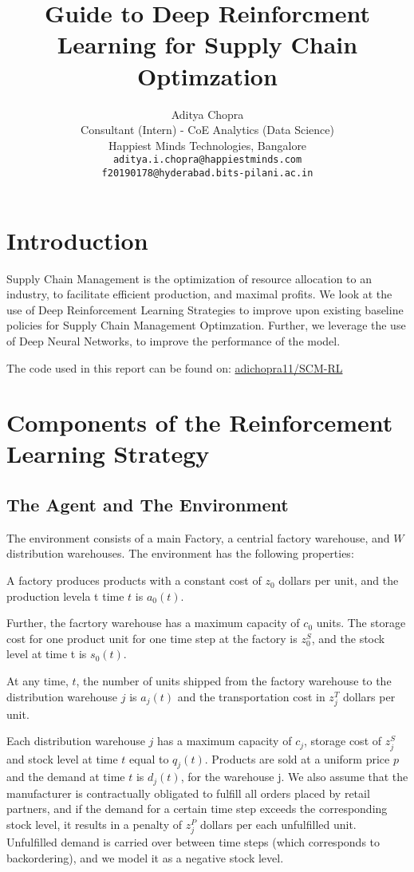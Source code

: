 \documentclass{article}
\title{Guide to Deep Reinforcment Learning for Supply Chain Optimzation}
\author{ {Aditya Chopra} \\
	Consultant (Intern) - CoE Analytics (Data Science) \\
	Happiest Minds Technologies, Bangalore \\
	\texttt{aditya.i.chopra@happiestminds.com} \\
	\texttt{f20190178@hyderabad.bits-pilani.ac.in}
}
\begin{document}
\maketitle

\section{Introduction}

Supply Chain Management is the optimization of resource allocation to an industry, to facilitate efficient production, and maximal profits. We look at the use of Deep Reinforcement Learning Strategies to improve upon existing baseline policies for Supply Chain Management Optimzation. Further, we leverage the use of Deep Neural Networks, to improve the performance of the model.

The code used in this report can be found on: \href{https://github.com/adichopra11/SCM-RL}{adichopra11/SCM-RL}


\section{Components of the Reinforcement Learning Strategy}

\subsection{The Agent and The Environment}
The environment consists of a main Factory, a centrial factory warehouse, and $W$ distribution warehouses. The environment has the following properties:

A factory produces products with a constant cost of $z_0$ dollars per unit, and the production levela t time $t$ is $a_0(t).$ 

Further, the facrtory warehouse has a maximum capacity of $c_0$ units. The storage cost for one product unit for one time step at the factory is $z_0^S$, and the stock level at time t is $s_0(t)$.

At any time, $t$, the number of units shipped from the factory warehouse to the distribution warehouse $j$ is $a_j(t)$ and the transportation cost in $z_j^T$ dollars per unit. 

Each distribution warehouse $j$ has a maximum capacity of $c_j$, storage cost of $z_j^S$ and stock level at time $t$ equal to $q_j(t)$. Products are sold at a uniform price $p$ and the demand at time $t$ is $d_j(t)$, for the warehouse j. We also assume that the manufacturer is contractually obligated to fulfill all orders placed by retail partners, and if the demand for a certain time step exceeds the corresponding stock level, it results in a penalty of $z_j^P$ dollars per each unfulfilled unit. Unfulfilled demand is carried over between time steps (which corresponds to backordering), and we model it as a negative stock level.
\end{document}
